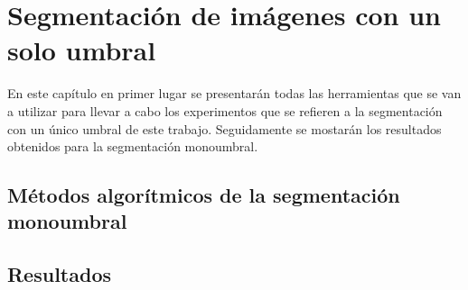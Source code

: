 \chapter{Segmentación de imágenes con un solo umbral}\label{monoumbral}

En este capítulo en primer lugar se presentarán todas las herramientas que se van a utilizar para llevar a cabo los experimentos que se refieren a la segmentación con un único umbral de este trabajo. Seguidamente se mostarán los resultados obtenidos para la segmentación monoumbral.


\section{Métodos algorítmicos de la segmentación monoumbral}\label{sec:algoritmosmono}


\section{Resultados}\label{sec:resultadosmono}